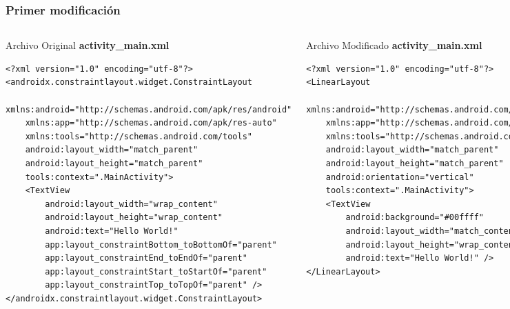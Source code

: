 \begin{frame}[fragile]
\frametitle{Primer modificaci\'on}

\begin{columns}
\begin{block}{Archivo Original \textbf{activity\_main.xml}}
\begin{verbatim}
<?xml version="1.0" encoding="utf-8"?>
<androidx.constraintlayout.widget.ConstraintLayout 
    xmlns:android="http://schemas.android.com/apk/res/android"
    xmlns:app="http://schemas.android.com/apk/res-auto"
    xmlns:tools="http://schemas.android.com/tools"
    android:layout_width="match_parent"
    android:layout_height="match_parent"
    tools:context=".MainActivity">
    <TextView
        android:layout_width="wrap_content"
        android:layout_height="wrap_content"
        android:text="Hello World!"
        app:layout_constraintBottom_toBottomOf="parent"
        app:layout_constraintEnd_toEndOf="parent"
        app:layout_constraintStart_toStartOf="parent"
        app:layout_constraintTop_toTopOf="parent" />
</androidx.constraintlayout.widget.ConstraintLayout>
\end{verbatim}
\end{block}
\begin{block}{Archivo Modificado \textbf{activity\_main.xml}}
\begin{verbatim}
<?xml version="1.0" encoding="utf-8"?>
<LinearLayout 
    xmlns:android="http://schemas.android.com/apk/res/android"
    xmlns:app="http://schemas.android.com/apk/res-auto"
    xmlns:tools="http://schemas.android.com/tools"
    android:layout_width="match_parent"
    android:layout_height="match_parent"
    android:orientation="vertical"
    tools:context=".MainActivity">
    <TextView
        android:background="#00ffff"
        android:layout_width="match_content"
        android:layout_height="wrap_content"
        android:text="Hello World!" />
</LinearLayout>


\end{verbatim}
\end{block}
\end{columns}
\end{frame}




